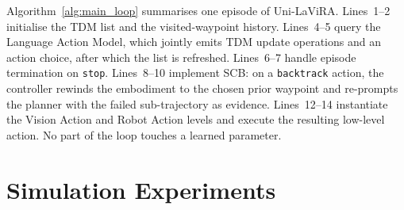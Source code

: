 \documentclass[conference]{IEEEtran}
\newcommand{\ourmethod}{Uni-LaViRA\xspace}
\begin{document}
Algorithm~\ref{alg:main_loop} summarises one episode of \ourmethod. Lines~1--2
initialise the TDM list and the visited-waypoint history. Lines~4--5 query the
Language Action Model, which jointly emits TDM update operations and an action
choice, after which the list is refreshed. Lines~6--7 handle episode
termination on \texttt{stop}. Lines~8--10 implement SCB: on a
\texttt{backtrack} action, the controller rewinds the embodiment to the chosen
prior waypoint and re-prompts the planner with the failed sub-trajectory as
evidence. Lines~12--14 instantiate the Vision Action and Robot Action levels
and execute the resulting low-level action. No part of the loop touches a
learned parameter.

\section{Simulation Experiments}
\label{sec:experiments}
\end{document}
